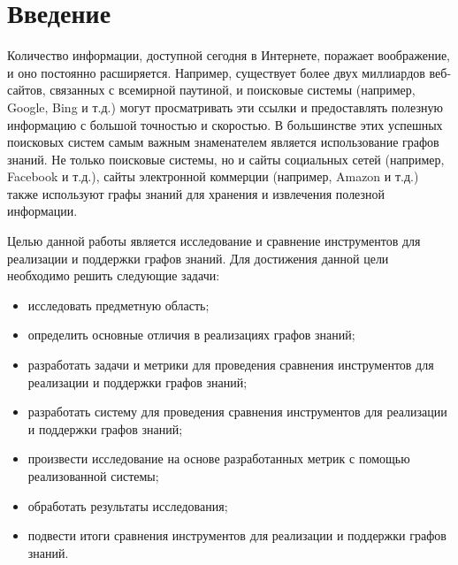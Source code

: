 \chapter*{Введение} %

Количество информации, доступной сегодня в Интернете, поражает воображение, и оно постоянно расширяется. Например, существует более двух
миллиардов веб-сайтов, связанных с всемирной паутиной, и поисковые системы (например, Google, Bing и т.д.) могут просматривать эти ссылки и
предоставлять полезную информацию с большой точностью и скоростью. В большинстве этих успешных поисковых систем самым важным знаменателем
является использование графов знаний. Не только поисковые системы, но и сайты социальных сетей (например, Facebook и т.д.), сайты электронной
коммерции (например, Amazon и т.д.) также используют графы знаний для хранения и извлечения полезной информации.

Целью данной работы является исследование и сравнение инструментов для реализации и поддержки графов знаний. Для достижения данной цели необходимо решить следующие задачи:

\begin{itemize}
    \item исследовать предметную область;
    \item определить основные отличия в реализациях графов знаний;
    \item разработать задачи и метрики для проведения сравнения инструментов для реализации и поддержки графов знаний;
    \item разработать систему для проведения сравнения инструментов для реализации и поддержки графов знаний;
    \item произвести исследование на основе разработанных метрик с помощью реализованной системы;
    \item обработать результаты исследования;
    \item подвести итоги сравнения инструментов для реализации и поддержки графов знаний.
\end{itemize}

